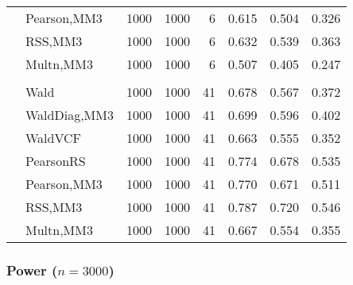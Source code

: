 \documentclass[
]{article}
\begin{document}
\begin{table}[H]
{\begin{tabular}[t]{llrrrrrr}
\hspace{1em} & Pearson,MM3 & 1000 & 1000 & 6 & 0.615 & 0.504 & 0.326\\

\hspace{1em} & RSS,MM3 & 1000 & 1000 & 6 & 0.632 & 0.539 & 0.363\\

\hspace{1em} & Multn,MM3 & 1000 & 1000 & 6 & 0.507 & 0.405 & 0.247\\
\cmidrule{1-8}
\addlinespace[0.3em]
\multicolumn{8}{l}{\textbf{3F 15V}}\\
\hspace{1em} & Wald & 1000 & 1000 & 41 & 0.678 & 0.567 & 0.372\\

\hspace{1em} & WaldDiag,MM3 & 1000 & 1000 & 41 & 0.699 & 0.596 & 0.402\\

\hspace{1em} & WaldVCF & 1000 & 1000 & 41 & 0.663 & 0.555 & 0.352\\

\hspace{1em} & PearsonRS & 1000 & 1000 & 41 & 0.774 & 0.678 & 0.535\\

\hspace{1em} & Pearson,MM3 & 1000 & 1000 & 41 & 0.770 & 0.671 & 0.511\\

\hspace{1em} & RSS,MM3 & 1000 & 1000 & 41 & 0.787 & 0.720 & 0.546\\

\hspace{1em} & Multn,MM3 & 1000 & 1000 & 41 & 0.667 & 0.554 & 0.355\\
\bottomrule
\end{tabular}}
\end{table}

\hypertarget{power-n3000}{%
\subsubsection{\texorpdfstring{Power
(\(n=3000\))}{Power (n=3000)}}\label{power-n3000}}
\end{document}
